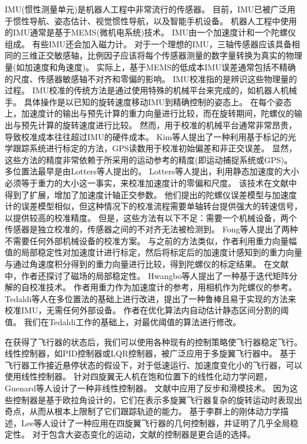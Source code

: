 \documentclass[
  type=master
]{gdutthesis}
\begin{document}
IMU(惯性测量单元)是机器人工程中非常流行的传感器。
目前，IMU已被广泛用于惯性导航\cite{jekeli2012inertial}、姿态估计\cite{mahony2008nonlinear}、视觉惯性导航\cite{baldwin2009inertial}，以及智能手机设备\cite{li2013real}。
机器人工程中使用的IMU通常是基于MEMS(微机电系统)技术。
IMU由一个加速度计和一个陀螺仪组成。
有些IMU还会加入磁力计。
对于一个理想的IMU，三轴传感器应该具备相同的三维正交敏感轴，比例因子应该将每个传感器测量的数字量转换为真实的物理量(如加速度和角速度)。
实际上，基于MEMS的低成本IMU误差通常包括不精确的尺度、传感器敏感轴不对齐和零偏的影响。
IMU校准指的是辨识这些物理量的过程。
IMU校准的传统方法是通过使用特殊的机械平台来完成的，如机器人机械手。
具体操作是以已知的旋转速度移动IMU到精确控制的姿态上\cite{hall2000case}。
在每个姿态上，加速度计的输出与预先计算的重力向量进行比较，而在旋转期间，陀螺仪的输出与预先计算的旋转速度进行比较。
然而，用于校准的机械平台通常非常昂贵，导致校准成本往往超过IMU的硬件成本。
Kim等人提出了一种利用基于标记的光学跟踪系统进行标定的方法，GPS读数用于校准初始偏差和非正交误差\cite{kim2004initial}。
显然，这些方法的精度非常依赖于所采用的运动参考的精度(即运动捕捉系统或GPS)。
多位置法最早是由Lotters等人提出的\cite{lotters1998procedure}。
Lotters等人提出，利用静态加速度的大小必须等于重力的大小这一事实，来校准加速度计的零偏和尺度。
该技术在文献\cite{syed2007new}中得到了扩展，增加了加速度计轴正交参数。
他们提出的陀螺仪误差模型与加速度计的误差模型相似，但这种情况下的校准流程需要单轴转台提供强大的转速信号，以提供较高的校准精度。
但是，这些方法有以下不足：需要一个机械设备，两个传感器是独立校准的，传感器之间的不对齐无法被检测到。
Fong等人提出了两种不需要任何外部机械设备的校准方案\cite{fong2008methods}。
与之前的方法类似，作者利用重力向量幅值的局部稳定性对加速度计进行标定，然后将标定后的加速度计感知到的重力向量与通过角速度积分得到的重力向量进行比较，得到陀螺仪的标定结果。
在文献\cite{cheuk2012automatic}中，作者还探讨了磁场的局部稳定性。
Hwangbo等人提出了一种基于迭代矩阵分解的自校准技术\cite{hwangbo2013imu}。
作者用重力作为加速度计的参考，用相机作为陀螺仪的参考。
Tedaldi等人在多位置法的基础上进行改进，提出了一种鲁棒且易于实现的方法来校准IMU，无需任何外部设备\cite{tedaldi2014robust}。
作者在优化算法内自动估计静态区间分割的阈值。
我们在Tedaldi工作的基础上，对最优阈值的算法进行修改。

在获得了飞行器的状态后，我们可以使用各种现有的控制策略使飞行器稳定飞行。
线性控制器，如PID控制器或LQR控制器，被广泛应用于多旋翼飞行器中\cite{hoffmann2007quadrotor,castillo2004stabilization,nice2004design}。
基于飞行器工作接近悬停状态的假设下，对于低速运行、加速度变化小的飞行器，可以使用线性控制器。
针对四旋翼无人机在饱和位置下的线性化动力学问题，Guenard等人设计了一种非线性控制器\cite{guenard2005dynamic}。
文献\cite{bouabdallah2005backstepping}中应用了反步和滑模技术。
因为这些控制器是基于欧拉角设计的，它们在表示多旋翼飞行器复杂的旋转运动时表现出奇点，从而从根本上限制了它们跟踪轨迹的能力。
基于李群上的刚体动力学描述，Lee等人设计了一种应用在四旋翼飞行器的几何控制器，并证明了几乎全局稳定性\cite{lee2010geometric}。
对于包含大姿态变化的运动，文献\cite{lee2010geometric}的控制器是更合适的选择。
\end{document}
